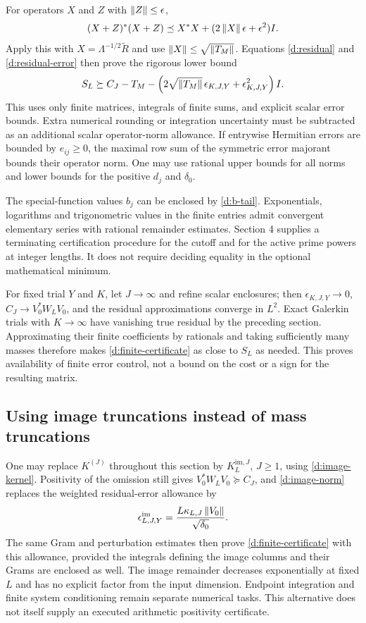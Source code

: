 For operators $X$ and $Z$ with $\left\lVert Z\right\rVert\le\epsilon$,
\[
(X+Z)^*(X+Z)\preceq X^*X+(2\left\lVert X\right\rVert\epsilon+\epsilon^2)I.
\]
Apply this with $X=\Lambda^{-1/2}\widetilde R$ and use
$\left\lVert X\right\rVert\le\sqrt{\left\lVert T_M\right\rVert}$. Equations \eqref{d:residual} and
\eqref{d:residual-error} then prove the rigorous lower bound
\begin{equation}\label{d:finite-certificate}
S_L\succeq C_J-T_M-
\left(2\sqrt{\left\lVert T_M\right\rVert}\,\epsilon_{K,J,Y}
+\epsilon_{K,J,Y}^2\right)I.
\end{equation}
This uses only finite matrices, integrals of finite sums, and explicit
scalar error bounds. Extra numerical rounding or integration uncertainty
must be subtracted as an additional scalar operator-norm allowance.
If entrywise Hermitian errors are bounded by $e_{ij}\ge0$, the maximal
row sum of the symmetric error majorant bounds their operator norm.
One may use rational upper bounds for all norms and lower bounds for
the positive $d_j$ and $\delta_0$.

The special-function values $b_j$ can be enclosed by \eqref{d:b-tail}.
Exponentials, logarithms and trigonometric values in the finite entries
admit convergent elementary series with rational remainder estimates.
Section 4 supplies a terminating certification procedure for the cutoff
and for the active prime powers at integer lengths. It does not require
deciding equality in the optional mathematical minimum.

For fixed trial $Y$ and $K$, let $J\to\infty$ and refine scalar enclosures;
then $\epsilon_{K,J,Y}\to0$, $C_J\to V_0^*W_LV_0$, and the residual
approximations converge in $L^2$. Exact Galerkin trials with $K\to\infty$
have vanishing true residual by the preceding section. Approximating their
finite coefficients by rationals and taking sufficiently many masses
therefore makes \eqref{d:finite-certificate} as close to $S_L$ as needed.
This proves availability of finite error control, not a bound on the cost
or a sign for the resulting matrix.

\subsection{Using image truncations instead of mass truncations}
One may replace $K^{(J)}$ throughout this section by
$K_L^{\mathrm{im},J}$, $J\ge1$, using \eqref{d:image-kernel}.
Positivity of the omission still gives $V_0^*W_LV_0\succeq C_J$, and
\eqref{d:image-norm} replaces the weighted residual-error allowance by
\[
\epsilon^{\mathrm{im}}_{L,J,Y}
=\frac{L\kappa_{L,J}\left\lVert V_0\right\rVert}{\sqrt{\delta_0}}.
\]
The same Gram and perturbation estimates then prove
\eqref{d:finite-certificate} with this allowance, provided the integrals
defining the image columns and their Grams are enclosed as well.
The image remainder decreases exponentially at fixed $L$ and has no
explicit factor from the input dimension. Endpoint integration and finite
system conditioning remain separate numerical tasks. This alternative
does not itself supply an executed arithmetic positivity certificate.

